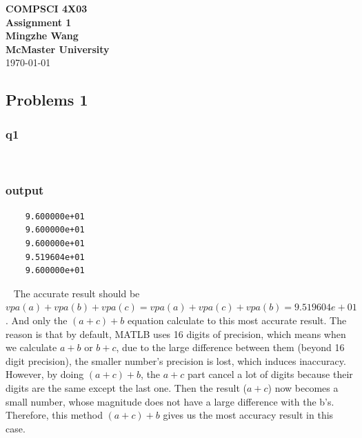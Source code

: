\documentclass[11pt,fleqn]{exam}
\newcommand{\nn}{~\newline \noindent }
\begin{document}
	
	\begin{center}
		
		{\large \textbf{COMPSCI 4X03}}\\[2mm]
		{\huge \textbf{Assignment 1}}\\[6mm]
		{\large \textbf{Mingzhe Wang}}\\[2mm]
		{\large \textbf{McMaster University}}\\[6mm]
		{\large \today}
		
	\end{center}
	
	\medskip
		
	\subsection*{Problems 1}
	\subsubsection*{q1}
	
	
	\nn
	\subsubsection*{output}
	\begin{lstlisting}
	9.600000e+01
	9.600000e+01
	9.600000e+01
	9.519604e+01
	9.600000e+01
	\end{lstlisting}
	
	\nn
	The accurate result should be $vpa(a) + vpa(b) + vpa(c) = vpa(a) + vpa(c) + vpa(b) = 9.519604e+01$. And only the $(a+c)+b$ equation calculate to this most accurate result. The reason is that by default, MATLB uses 16 digits of precision, which means when we calculate $a + b$ or $b + c$, due to the large difference between them (beyond 16 digit precision), the smaller number's precision is lost, which induces inaccuracy. However, by doing $(a+c)+b$, the $a+c$ part cancel a lot of digits because their digits are the same except the last one. Then the result ($a+c$) now becomes a small number, whose magnitude does not have a large difference with the b's.  Therefore, this method $(a+c)+b$ gives us the most accuracy result in this case.
\end{document}
